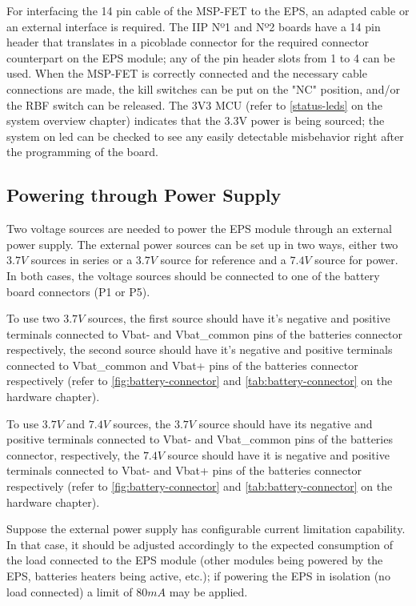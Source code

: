 For interfacing the 14 pin cable of the MSP-FET to the EPS, an adapted cable or an external interface is required. 
The IIP\cite{iip} Nº1 and Nº2 boards have a 14 pin header that translates in a picoblade connector for the required connector counterpart on the EPS module; any of the pin header slots from 1 to 4 can be used.
When the MSP-FET is correctly connected and the necessary cable connections are made, the kill switches can be put on the "NC" position, and/or the RBF switch can be released.
The 3V3 MCU (refer to \autoref{status-leds} on the system overview chapter) indicates that the 3.3V power is being sourced; the system on led can be checked to see any easily detectable misbehavior right after the programming of the board. 



\subsection{Powering through Power Supply}

Two voltage sources are needed to power the EPS module through an external power supply.
The external power sources can be set up in two ways, either two \(3.7 V\) sources in series or a \(3.7 V\) source for reference and a \(7.4 V\) source for power.
In both cases, the voltage sources should be connected to one of the battery board connectors (P1 or P5).

To use two \(3.7 V\) sources, the first source should have it's negative and positive terminals connected to Vbat- and Vbat\_common pins of the batteries connector respectively, the second source should have it's negative and positive terminals connected to Vbat\_common and Vbat+ pins of the batteries connector respectively (refer to \autoref{fig:battery-connector} and \autoref{tab:battery-connector} on the hardware chapter).

To use \(3.7 V\) and \(7.4 V\) sources, the \(3.7 V\) source should have its negative and positive terminals connected to Vbat- and Vbat\_common pins of the batteries connector, respectively, the \(7.4 V\) source should have it is negative and positive terminals connected to Vbat- and Vbat+ pins of the batteries connector respectively (refer to \autoref{fig:battery-connector} and \autoref{tab:battery-connector} on the hardware chapter).

Suppose the external power supply has configurable current limitation capability. In that case, it should be adjusted accordingly to the expected consumption of the load connected to the EPS module (other modules being powered by the EPS, batteries heaters being active, etc.); if powering the EPS in isolation (no load connected) a limit of \(80 mA\) may be applied.

